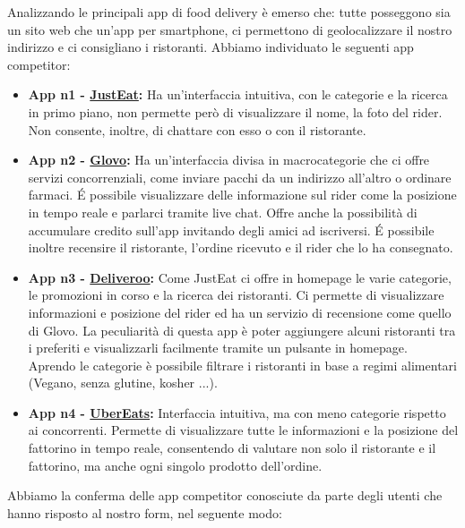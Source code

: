 \documentclass{article}
\begin{document}
     \par
    \vspace{0.5cm}
    Analizzando le principali app di food delivery è emerso che: tutte posseggono sia un sito web che un'app per smartphone, ci permettono di geolocalizzare il nostro indirizzo e ci consigliano i ristoranti.
    Abbiamo individuato le seguenti app competitor:
\begin{itemize}
        \item \textbf{App n1 - \href{https://www.justeat.it}{JustEat}:} Ha un’interfaccia intuitiva, con le categorie e la ricerca in primo piano, non permette però di visualizzare il nome, la foto del rider. Non consente, inoltre, di chattare con esso o con il ristorante.

        \item \textbf{App n2 - \href{https://glovoapp.com/it/it/}{Glovo}:} Ha un'interfaccia divisa in macrocategorie che ci offre servizi concorrenziali, come inviare pacchi da un indirizzo all’altro o ordinare farmaci. É possibile visualizzare delle informazione sul rider come la posizione in tempo reale e parlarci tramite live chat. Offre anche la possibilità di accumulare credito sull’app invitando degli amici ad iscriversi. É possibile inoltre recensire il ristorante, l’ordine ricevuto e il rider che lo ha consegnato.

        \item \textbf{App n3 - \href{https://deliveroo.it/it/}{Deliveroo}:} Come JustEat ci offre in homepage le varie categorie, le promozioni in corso e la ricerca dei ristoranti. Ci permette di visualizzare informazioni e posizione del rider ed ha un servizio di recensione come quello di Glovo. La peculiarità di questa app è poter aggiungere alcuni ristoranti tra i preferiti e visualizzarli facilmente tramite un pulsante in homepage. Aprendo le categorie è possibile filtrare i ristoranti in base a regimi alimentari (Vegano, senza glutine, kosher ...).

        \item \textbf{App n4 - \href{https://www.ubereats.com/it}{UberEats}:} Interfaccia intuitiva, ma con meno categorie rispetto ai concorrenti. Permette di visualizzare tutte le informazioni e la posizione del fattorino in tempo reale, consentendo di valutare non solo il ristorante e il fattorino, ma anche ogni singolo prodotto dell'ordine.

    

\end{itemize}Abbiamo la conferma delle app competitor conosciute da parte degli utenti che hanno risposto al nostro form, nel seguente modo:
\end{document}
